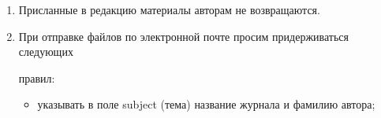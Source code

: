 {{\begin{enumerate}[1.]
{\noindent


\textbf{Описание ГОСТа:}





GOST 8.586.5-2005. 2007. Metodika vypolneniya izmereniy. Izmerenie raskhoda i~ko\-li\-che\-st\-va zhidkostey i gazov s


pomoshch'yu standartnykh suzhayushchikh ustroystv [Method of measurement.


Measurement of flow rate and volume of liquids and gases by means of orifice devices]. Moscow:


Standardinform  Publs. 10~p.





\noindent


\textbf{Описание патента:}





.


2006. Sposob orientirovaniya po krenu letatel'nogo


apparata s opti\-che\-skoy golovkoy


samonavedeniya [The way to orient on the roll of aircraft with optical homing head].


Patent RF No.\,2280590.


}





\vspace*{-2pt}





\item Присланные в редакцию материалы авторам не возвращаются.\\[-14pt]





\item При отправке файлов по электронной почте просим придерживаться следующих


правил:\\[-14pt]


\begin{itemize}


\item указывать в поле subject (тема) название журнала и фамилию автора;\\[-12pt]



\end{itemize}
\end{enumerate}}}
